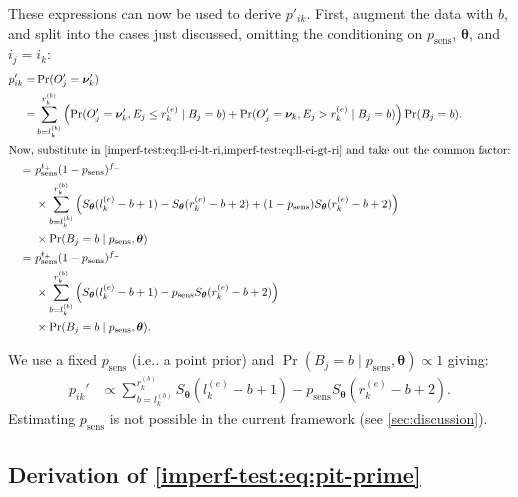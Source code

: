 \documentclass{article}
\makeatletter
\DeclareMathOperator{\prob}{\mathrm{Pr}}
\renewcommand{\vec}[1]{\bm{#1}}
\newcommand{\psens}{p_\text{sens}}
\DeclareRobustCommand\onedot{\futurelet\@let@token\@onedot}
\def\@onedot{\ifx\@let@token.\else.\null\fi\xspace}
\def\ie{i.e\onedot} \def\Ie{{I.e}\onedot}
\makeatother
\begin{document}
These expressions can now be used to derive $p'_{ik}$.
First, augment the data with $b$, and split into the cases just discussed, omitting the conditioning on $\psens$, $\vec{\theta}$, and $i_j = i_k$:
\begin{align}
p_{ik}'
=& \prob(O'_j = \vec{\nu}_k') \\
=& \sum_{b = l_k^{(b)}}^{r_k^{(b)}} \left( \prob(O'_j = \vec{\nu}_k', E_j \leq r_k^{(e)} \mid B_j = b) + \prob(O'_j = \vec{\nu}_k, E_j > r_k^{(e)} \mid B_j = b) \right) \prob(B_j = b). \\
\intertext{Now, substitute in \cref{imperf-test:eq:ll-ei-lt-ri,imperf-test:eq:ll-ei-gt-ri} and take out the common factor:}
=\ &  p_\text{sens}^{t_+} (1 - p_\text{sens})^{f_-} \\
 & \times \sum_{b = l_k^{(b)}}^{r_k^{(b)}} \left( S_{\vec{\theta}}(l_k^{(e)} - b + 1) - S_{\vec{\theta}}(r_k^{(e)} - b + 2) + (1 - p_\text{sens}) S_{\vec{\theta}}(r_k^{(e)} - b + 2) \right) \\ 
  & \times \prob(B_j = b \mid p_\text{sens}, \vec{\theta}) \\
=\ &  p_\text{sens}^{t_+} (1 - p_\text{sens})^{f_-} \\
  & \times \sum_{b = l_k^{(b)}}^{r_k^{(b)}} \left( S_{\vec{\theta}}(l_k^{(e)} - b + 1) - p_\text{sens} S_{\vec{\theta}}(r_k^{(e)} - b + 2) \right) \\
  & \times \prob(B_j = b \mid p_\text{sens}, \vec{\theta}).
\label{imperf-test:eq:pia-prime}
\end{align}

We use a fixed $\psens$ (\ie a point prior) and $\prob(B_j = b \mid \psens, \vec{\theta}) \propto 1$ giving:
\begin{align}
p_{ik}'
&\propto \sum_{b = l_k^{(b)}}^{r_k^{(b)}} S_{\vec{\theta}}(l_k^{(e)} - b + 1) - p_\text{sens} S_{\vec{\theta}}(r_k^{(e)} - b + 2).
\end{align}
Estimating $\psens$ is not possible in the current framework (see \cref{sec:discussion}).

\subsection{Derivation of \cref{imperf-test:eq:pit-prime}} \label{sec:p-iu-dash}
\end{document}
